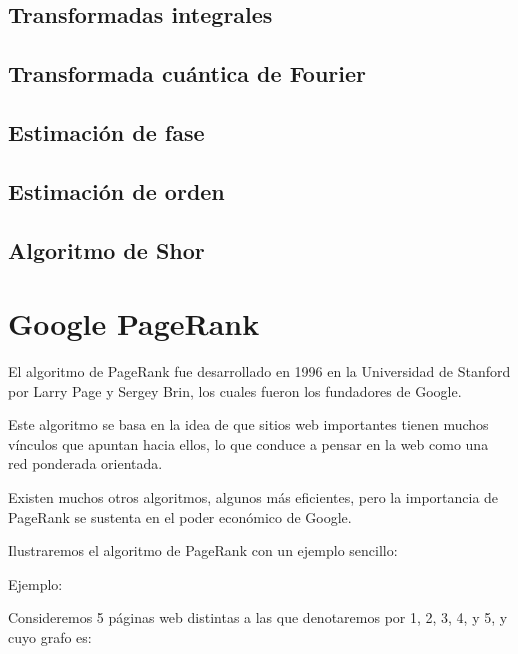 \documentclass[11pt, spanish]{report}
\begin{document}










\section{Transformadas integrales}

\section{Transformada cuántica de Fourier}

\section{Estimación de fase}

\section{Estimación de orden}

\section{Algoritmo de Shor}

\chapter{Google PageRank}

El algoritmo de PageRank fue desarrollado en 1996 en la Universidad de Stanford por Larry Page y Sergey Brin, los cuales fueron los fundadores de Google.

Este algoritmo se basa en la idea de que sitios web importantes tienen muchos vínculos que apuntan hacia ellos, lo que conduce a pensar en la web como una red ponderada orientada.

Existen muchos otros algoritmos, algunos más eficientes, pero la importancia de PageRank se sustenta en el poder económico de Google.

Ilustraremos el algoritmo de PageRank con un ejemplo sencillo:

Ejemplo:

Consideremos 5 páginas web distintas a las que denotaremos por 1, 2, 3, 4, y 5, y cuyo grafo es:
\vspace{3cm}
\end{document}
